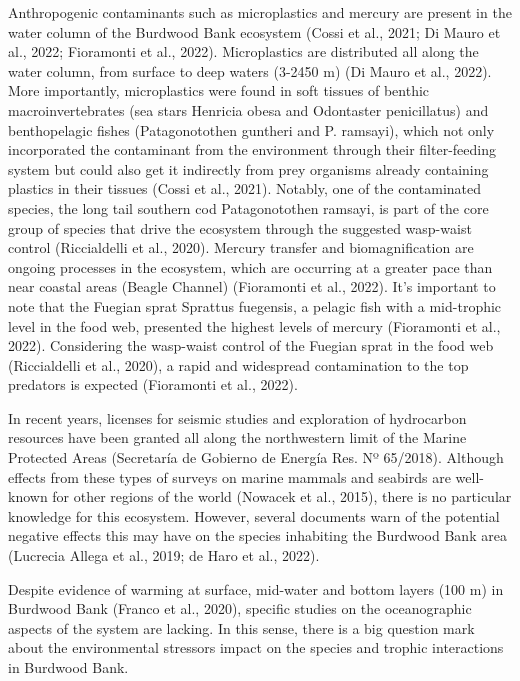 \documentclass[
]{article}
\begin{document}
Anthropogenic contaminants such as microplastics and mercury are present
in the water column of the Burdwood Bank ecosystem (Cossi et al., 2021;
Di Mauro et al., 2022; Fioramonti et al., 2022). Microplastics are
distributed all along the water column, from surface to deep waters
(3-2450 m) (Di Mauro et al., 2022). More importantly, microplastics were
found in soft tissues of benthic macroinvertebrates (sea stars Henricia
obesa and Odontaster penicillatus) and benthopelagic fishes
(Patagonotothen guntheri and P. ramsayi), which not only incorporated
the contaminant from the environment through their filter-feeding system
but could also get it indirectly from prey organisms already containing
plastics in their tissues (Cossi et al., 2021). Notably, one of the
contaminated species, the long tail southern cod Patagonotothen ramsayi,
is part of the core group of species that drive the ecosystem through
the suggested wasp-waist control (Riccialdelli et al., 2020). Mercury
transfer and biomagnification are ongoing processes in the ecosystem,
which are occurring at a greater pace than near coastal areas (Beagle
Channel) (Fioramonti et al., 2022). It's important to note that the
Fuegian sprat Sprattus fuegensis, a pelagic fish with a mid-trophic
level in the food web, presented the highest levels of mercury
(Fioramonti et al., 2022). Considering the wasp-waist control of the
Fuegian sprat in the food web (Riccialdelli et al., 2020), a rapid and
widespread contamination to the top predators is expected (Fioramonti et
al., 2022).

In recent years, licenses for seismic studies and exploration of
hydrocarbon resources have been granted all along the northwestern limit
of the Marine Protected Areas (Secretaría de Gobierno de Energía Res. Nº
65/2018). Although effects from these types of surveys on marine mammals
and seabirds are well-known for other regions of the world (Nowacek et
al., 2015), there is no particular knowledge for this ecosystem.
However, several documents warn of the potential negative effects this
may have on the species inhabiting the Burdwood Bank area (Lucrecia
Allega et al., 2019; de Haro et al., 2022).

Despite evidence of warming at surface, mid-water and bottom layers (100
m) in Burdwood Bank (Franco et al., 2020), specific studies on the
oceanographic aspects of the system are lacking. In this sense, there is
a big question mark about the environmental stressors impact on the
species and trophic interactions in Burdwood Bank.
\end{document}
